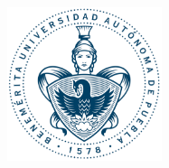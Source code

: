 \hskip-2.8cm
\begin{minipage}[c][10cm][s]{5cm} 
  \begin{center}
    \includegraphics[height=4.5cm]{graphs/buap}\\[10pt]
     \textcolor{-red!75!green!50}{\hskip2pt\vrule width2pt height18cm\hskip1mm
     \vrule width1pt height18cm\\[10pt]}
  \end{center}
\end{minipage}

